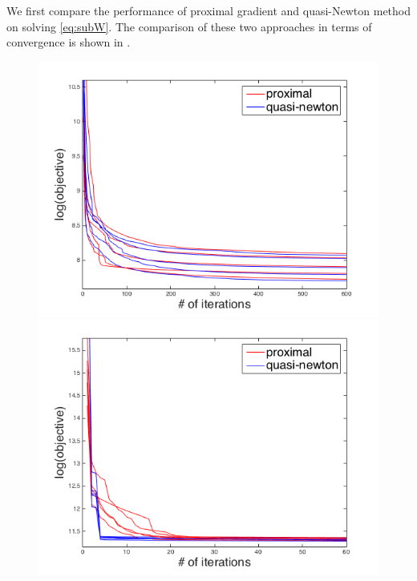 \documentclass{article}
\begin{document}
We first compare the performance of proximal gradient and quasi-Newton method on solving \cref{eq:subW}. The comparison of these two approaches in terms of convergence is shown in . 
\begin{figure}[htbp]
  \centering
  \begin{minipage}{0.24\textwidth}
    \centering
    \includegraphics[width=1\textwidth]{../yanyu_code/plots/sym_p30}
  \end{minipage}
  \hfill
  \begin{minipage}{0.24\textwidth}
    \centering
    \includegraphics[width=1\textwidth]{../yanyu_code/plots/asym_p30}
  \end{minipage}
  \hfill
  \begin{minipage}{0.24\textwidth}

\end{minipage}
\end{figure}
\end{document}
